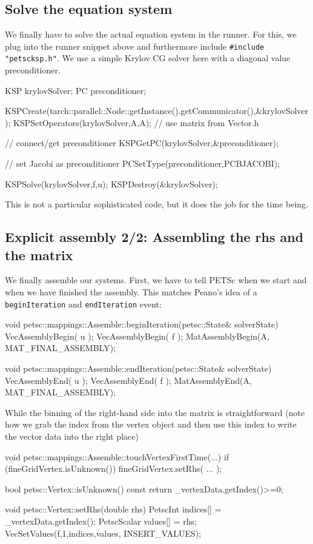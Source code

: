 \subsection{Solve the equation system}


We finally have to solve the actual equation system in the runner. For this, we
plug into the runner snippet above and furthermore include
\texttt{\#include "petscksp.h"}. We use a simple Krylov CG solver here with a
diagonal value preconditioner.

\begin{code}
KSP krylovSolver;
PC  preconditioner;

KSPCreate(tarch::parallel::Node::getInstance().getCommunicator(),&krylovSolver);
KSPSetOperators(krylovSolver,A,A); // use matrix from Vector.h

// connect/get preconditioner
KSPGetPC(krylovSolver,&preconditioner);

// set Jacobi as preconditioner
PCSetType(preconditioner,PCBJACOBI);

KSPSolve(krylovSolver,f,u);
KSPDestroy(&krylovSolver);
\end{code}

\noindent
This is not a particular sophisticated code, but it does the job for the time
being.


\subsection{Explicit assembly 2/2: Assembling the rhs and the matrix}

We finally assemble our systems. First, we have to tell
PETSc when we start and when we have finished the assembly.
This matches Peano's idea of a \texttt{beginIteration} and
\texttt{endIteration} event:
 
\begin{code}
void petsc::mappings::Assemble::beginIteration(petsc::State&  solverState) {
  VecAssemblyBegin( u );
  VecAssemblyBegin( f );
  MatAssemblyBegin(A, MAT_FINAL_ASSEMBLY);
}

void petsc::mappings::Assemble::endIteration(petsc::State&  solverState) {
  VecAssemblyEnd( u );
  VecAssemblyEnd( f );
  MatAssemblyEnd(A, MAT_FINAL_ASSEMBLY);
}
\end{code}


\noindent
While the binning of the right-hand side into the matrix is straightforward
(note how we grab the index from the vertex object and then use this index to
write the vector data into the right place)
\begin{code}
void petsc::mappings::Assemble::touchVertexFirstTime(...) {
  if (fineGridVertex.isUnknown()) {
    fineGridVertex.setRhs(
      ...
    );
  }
}

bool petsc::Vertex::isUnknown() const {
  return _vertexData.getIndex()>=0;
}

void petsc::Vertex::setRhs(double rhs) {
  PetscInt     indices[] = {_vertexData.getIndex()};
  PetscScalar  values[]  = {rhs};
  VecSetValues(f,1,indices,values, INSERT_VALUES);
}
\end{code}

